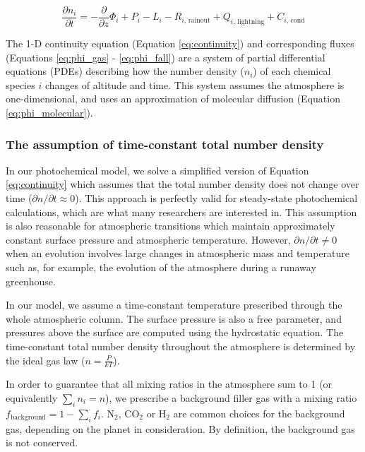 \documentclass{article}
\begin{document}
\begin{equation} \label{eq:continuity}
\frac{\partial n_{i}}{\partial t} = - \frac{\partial}{\partial z}\Phi_{i} + P_{i} - L_{i} - R_{i\text{, rainout}} + Q_{i\text{, lightning}} + C_{i\text{, cond}}
\end{equation}

The 1-D continuity equation (Equation \eqref{eq:continuity}) and corresponding fluxes (Equations \eqref{eq:phi_gas} - \eqref{eq:phi_fall}) are a system of partial differential equations (PDEs) describing how the number density ($n_{i}$) of each chemical species $i$ changes of altitude and time. This system assumes the atmosphere is one-dimensional, and uses an approximation of molecular diffusion (Equation \eqref{eq:phi_molecular}).

\subsubsection{The assumption of time-constant total number density} \label{sec:assume_const_num_den}

In our photochemical model, we solve a simplified version of Equation \eqref{eq:continuity} which assumes that the total number density does not change over time ($\partial n / \partial t \approx 0$). This approach is perfectly valid for steady-state photochemical calculations, which are what many researchers are interested in. This assumption is also reasonable for atmospheric transitions which maintain approximately constant surface pressure and atmospheric temperature. However, $\partial n / \partial t \neq 0$ when an evolution involves large changes in atmospheric mass and temperature such as, for example, the evolution of the atmosphere during a runaway greenhouse.

In our model, we assume a time-constant temperature prescribed through the whole atmospheric column. The surface pressure is also a free parameter, and pressures above the surface are computed using the hydrostatic equation. The time-constant total number density throughout the atmosphere is determined by the ideal gas law ($n = \frac{P}{kT}$).

In order to guarantee that all mixing ratios in the atmosphere sum to 1 (or equivalently $\sum_i n_i = n$), we prescribe a background filler gas with a mixing ratio $f_\mathrm{background} = 1 - \sum_i f_i$. N$_2$, CO$_2$ or H$_2$ are common choices for the background gas, depending on the planet in consideration. By definition, the background gas is not conserved.
\end{document}
